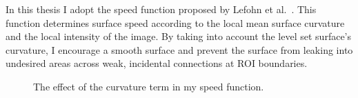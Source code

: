 In this thesis I adopt the speed function proposed by Lefohn et al.~\cite{Lefohn-2003-MICCAI,Lefohn-2003-Vis,Lefohn-2004}. This function determines surface speed according to the local mean surface curvature and the local intensity of the image. By taking into account the level set surface's curvature, I encourage a smooth surface and prevent the surface from leaking into undesired areas across weak, incidental connections at ROI boundaries.

\begin{figure}[t]
\centering
{}
\caption{The effect of the curvature term in my speed function.}
\label{fig:curvatureeffect}
\end{figure}

